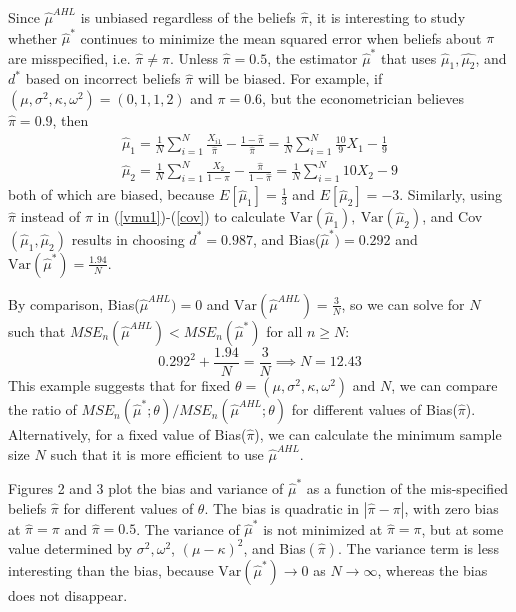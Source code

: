 \documentclass[12pt]{article}
\newcommand{\Var}[1]{\text{Var}\left(#1\right)}
\begin{document}
Since $\hat{\mu}^{AHL}$ is unbiased regardless of the beliefs $\hat{\pi}$, it is interesting to study whether $\hat{\mu}^*$ continues to minimize the mean squared error when beliefs about $\pi$ are misspecified, i.e. $\hat{\pi} \neq \pi$.  Unless $\hat{\pi}=0.5$, the estimator $\hat{\mu}^*$ that uses $\hat{\mu}_1, \hat{\mu_2}$, and $d^*$ based on incorrect beliefs $\hat{\pi}$ will be biased.  For example, if $(\mu, \sigma^2, \kappa, \omega^2) = (0, 1, 1, 2)$ and $\pi=0.6$, but the econometrician believes $\hat{\pi}=0.9$, then
\begin{gather*}
\hat{\mu}_1 = \frac{1}{N} \sum_{i=1}^N \frac{X_{i1}}{\hat{\pi}} - \frac{1-\hat{\pi}}{\hat{\pi}} = \frac{1}{N} \sum_{i=1}^N \frac{10}{9} X_1 - \frac{1}{9} \\
\hat{\mu}_2 = \frac{1}{N}\sum_{i=1}^N \frac{X_2}{1-\hat{\pi}} - \frac{\hat{\pi}}{1-\hat{\pi}} =  \frac{1}{N} \sum_{i=1}^N10 X_2 - 9
\end{gather*}
both of which are biased, because $E[\hat{\mu}_1] = \frac{1}{3}$ and $E[\hat{\mu}_2] = -3$.  Similarly, using $\hat{\pi}$ instead of $\pi$ in (\ref{vmu1})-(\ref{cov}) to calculate $\Var{\hat{\mu}_1},\ \Var{\hat{\mu}_2}$, and Cov$(\hat{\mu}_1, \hat{\mu}_2)$ results in choosing $d^* = 0.987$, and Bias(${\hat{\mu}}^*) = 0.292$ and $\Var{\hat{\mu}^*} = \frac{1.94}{N}$.

By comparison, Bias($\hat{\mu}^{AHL}) =  0$ and $\Var{\hat{\mu}^{AHL}} = \frac{3}{N}$, so we can solve for $N$ such that $MSE_n(\hat{\mu}^{AHL}) < MSE_n(\hat{\mu}^*)$ for all $n \geq N$:
$$0.292^2 + \frac{1.94}{N} = \frac{3}{N} \implies N = 12.43$$ 
This example suggests that for fixed $\theta = (\mu, \sigma^2, \kappa, \omega^2)$ and $N$, we can compare the ratio of $MSE_n(\hat{\mu}^*; \theta)/MSE_n(\hat{\mu}^{AHL};\theta) $ for different values of Bias($\hat{\pi}$).  Alternatively, for a fixed value of Bias($\hat{\pi}$), we can calculate the minimum sample size $N$ such that it is more efficient to use $\hat{\mu}^{AHL}$. 

Figures 2 and 3 plot the bias and variance of $\hat{\mu}^*$ as a function of the mis-specified beliefs $\hat{\pi}$ for different values of $\theta$.  The bias is quadratic in $|\hat{\pi}-\pi|$, with zero bias at $\hat{\pi}=\pi$ and $\hat{\pi}=0.5$.  The variance of $\hat{\mu}^*$ is not minimized at $\hat{\pi}=\pi$, but at some value determined by $\sigma^2, \omega^2$, $(\mu-\kappa)^2$, and Bias$(\hat{\pi})$.  The variance term is less interesting than the bias, because $\Var{\hat{\mu}^*}\to0$ as $N\to\infty$, whereas the bias does not disappear.  
\end{document}

